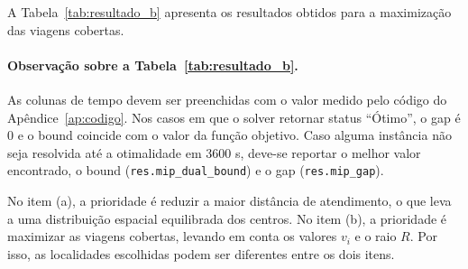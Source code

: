 \documentclass[12pt,a4paper]{article}
\begin{document}
A Tabela~\ref{tab:resultado_b} apresenta os resultados
obtidos para a maximização das viagens cobertas.

\begin{table}[H]
\centering
\caption{Resultados do item (b) --- maximização de viagens cobertas}
\label{tab:resultado_b}
\small
{}
\end{table}

\paragraph{Observação sobre a Tabela~\ref{tab:resultado_b}.}
As colunas de tempo devem ser preenchidas com o valor medido
pelo código do Apêndice~\ref{ap:codigo}. Nos casos em que o
solver retornar status ``Ótimo'', o gap é 0 e o bound
coincide com o valor da função objetivo. Caso alguma
instância não seja resolvida até a otimalidade em 3600 s,
deve-se reportar o melhor valor encontrado, o bound
(\texttt{res.mip\_dual\_bound}) e o gap
(\texttt{res.mip\_gap}).

No item (a), a prioridade é reduzir a maior distância de
atendimento, o que leva a uma distribuição espacial
equilibrada dos centros. No item (b), a prioridade é
maximizar as viagens cobertas, levando em conta os valores
$v_i$ e o raio $R$. Por isso, as localidades escolhidas
podem ser diferentes entre os dois itens.
\end{document}
